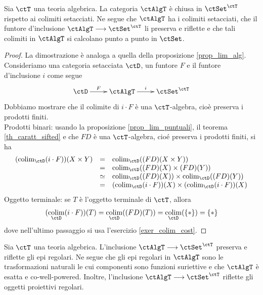\begin{proposition}\label{prop_colim_sift_AlgT}
 Sia \(\ctT\) una teoria algebrica. La categoria \(\ctAlgT\) è chiusa in \(\ctSet^{\ctT}\) rispetto ai colimiti setacciati.
 Ne segue che \(\ctAlgT\) ha i colimiti setacciati, che il funtore d'inclusione	\(\ctAlgT \fun \ctSet^{\ctT}\) li preserva e
 riflette e che tali colimiti in \(\ctAlgT\) si calcolano punto a punto in \(\ctSet\).
\end{proposition}

\begin{proof} La dimostrazione è analoga a quella della proposizione \ref{prop_lim_alg}.
 Consideriamo una categoria setacciata \(\ctD\), un funtore \(F\) e il funtore d'inclusione \(i\) come segue
 \[\xymatrix{\ctD \ar[r]^-{F} & \ctAlgT \ar[r]^-{i} & \ctSet^{\ctT}}\]
 Dobbiamo mostrare che il colimite di \(i \cdot F\) è una \(\ctT\)-algebra, cioè preserva i prodotti finiti. \\
 Prodotti binari: usando la proposizione \ref{prop_lim_puntuali}, il teorema \ref{th_caratt_sifted} e che \(FD\) è una
 \(\ctT\)-algebra, cioé preserva i prodotti finiti, si ha
 \[\begin{array}{rcl}
   (\colim_{\ctD}(i \cdot F))(X \times Y) & =      & \colim_{\ctD}((FD)(X \times Y))                                    \\
                                          & =      & \colim_{\ctD}((FD)(X) \times (FD)(Y))                              \\
                                          & \simeq & \colim_{\ctD}((FD)(X)) \times \colim_{\ctD}((FD)(Y))               \\
                                          & =      & (\colim_{\ctD}(i \cdot F))(X) \times (\colim_{\ctD}(i \cdot F))(X)
  \end{array}\]
 Oggetto terminale: se \(T\) è l'oggetto terminale di \(\ctT\), allora
 \[(\colim_{\ctD}(i \cdot F))(T) = \colim_{\ctD}((FD)(T)) = \colim_{\ctD}(\{\ast\}) = \{\ast\}\]
 dove nell'ultimo passaggio si usa l'esercizio \ref{exer_colim_cost}.
\end{proof}

\begin{corollary}\label{cor_epireg_AlgT}
 Sia \(\ctT\) una teoria algebrica. L'inclusione \(\ctAlgT \fun \ctSet^{\ctT}\) preserva e riflette gli epi regolari. Ne segue che gli
 epi regolari in \(\ctAlgT\) sono le trasformazioni naturali le cui componenti sono funzioni suriettive e che \(\ctAlgT\)
 è esatta e co-well-powered. Inoltre, l'inclusione \(\ctAlgT \fun \ctSet^{\ctT}\) riflette gli oggetti proiettivi regolari.
\end{corollary}

